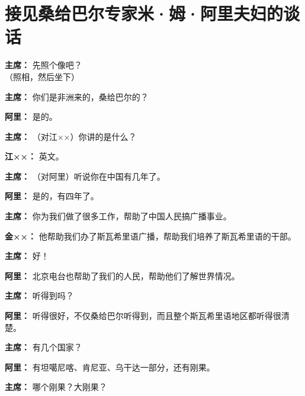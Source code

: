\section[接见桑给巴尔专家米·姆·阿里夫妇的谈话（一九六四年六月十八日）]{接见桑给巴尔专家米·姆·阿里夫妇的谈话}

\begin{duihua}

\item[\textbf{主席：}] 先照个像吧？\\（照相，然后坐下）

\item[\textbf{主席：}] 你们是非洲来的，桑给巴尔的？

\item[\textbf{阿里：}] 是的。

\item[\textbf{主席：}] （对江××）你讲的是什么？

\item[\textbf{江××：}] 英文。

\item[\textbf{主席：}] （对阿里）听说你在中国有几年了。

\item[\textbf{阿里：}] 是的，有四年了。

\item[\textbf{主席：}] 你为我们做了很多工作，帮助了中国人民搞广播事业。

\item[\textbf{金××：}] 他帮助我们办了斯瓦希里语广播，帮助我们培养了斯瓦希里语的干部。

\item[\textbf{主席：}] 好！

\item[\textbf{阿里：}] 北京电台也帮助了我们的人民，帮助他们了解世界情况。

\item[\textbf{主席：}] 听得到吗？

\item[\textbf{阿里：}] 听得很好，不仅桑给巴尔听得到，而且整个斯瓦希里语地区都听得很清楚。

\item[\textbf{主席：}] 有几个国家？

\item[\textbf{阿里：}] 有坦噶尼喀、肯尼亚、乌干达一部分，还有刚果。

\item[\textbf{主席：}] 哪个刚果？大刚果？


\end{duihua}
